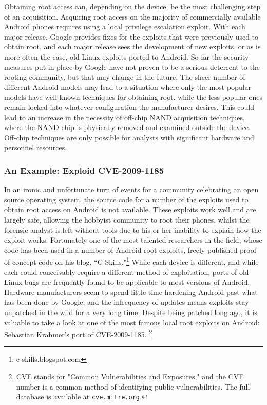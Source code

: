Obtaining root access can, depending on the device, be the most challenging step of an acquisition.  Acquiring
root access on the majority of commercially available Android phones requires using a local privilege escalation exploit.  With each
major release, Google provides fixes for the exploits that were previously used to obtain root, and each major release sees the
development of new exploits, or as is more often the case, old Linux exploits ported to Android.  So far the security measures put
in place by Google have not proven to be a serious deterrent to the rooting community, but that may change in the future.  The sheer
number of different Android models may lead to a situation where only the most popular models have well-known techniques for
obtaining root, while the less popular ones remain locked into whatever configuration the manufacturer desires.  This could lead to
an increase in the necessity of off-chip NAND acquisition techniques, where the NAND chip is physically removed and examined outside
the device. Off-chip techniques are only possible for analysts with significant hardware and personnel resources.

\subsubsection{An Example: Exploid CVE-2009-1185}
In an ironic and unfortunate turn of events for
a community celebrating an open source operating system, the source code for a number of the exploits used to obtain root access on
Android is not available.  These exploits work well and are largely safe, allowing the hobbyist community to root their phones,
whilst the forensic analyst is left without tools due to his or her inability to explain how the exploit works.  Fortunately one of
the most talented researchers in the field, whose code has been used in a number of Android root exploits, freely
published proof-of-concept code on his blog,
``C-Skills."\footnote{c-skills.blogspot.com}  While each device is different, and while each could conceivably require a different
method of exploitation, ports of old Linux bugs are frequently found to be applicable to most versions of Android.  Hardware
manufacturers seem to spend little time hardening Android past what has been done by Google, and the infrequency of updates means
exploits stay unpatched in the wild for a very long time. Despite being patched long ago, it is valuable to take a
look at one of the most famous local root exploits on Android: Sebastian Krahmer's port of CVE-2009-1185. \footnote{CVE stands for
"Common Vulnerabilities and Exposures," and the CVE number is a common method of identifying public vulnerabilities. The full 
database is available at \texttt{cve.mitre.org}. }
 
